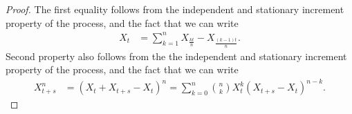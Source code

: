 \documentclass[letterpaper,10pt,english]{article}
\begin{document}
\begin{proof}
The first equality follows from the independent and stationary increment property of the process, 
and the fact that we can write 
\begin{align*}
X_t &= \sum_{k=1}^nX_{\frac{kt}{n}}-X_{\frac{(k-1)t}{n}}.
\end{align*}
Second property also follows from the the independent and stationary increment property of the process, 
and the fact that we can write 
\begin{align*}
X_{t+s}^n &= (X_{t} + X_{t+s}-X_{t})^n = \sum_{k=0}^n\binom{n}{k}X_t^k(X_{t+s}-X_t)^{n-k}.
\end{align*}

\end{proof}
\end{document}
